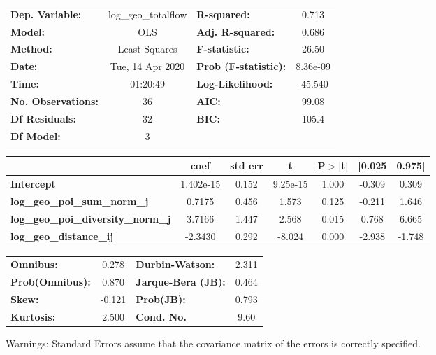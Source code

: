 \begin{center}
\begin{tabular}{lclc}
\toprule
\textbf{Dep. Variable:}                    & log\_geo\_totalflow & \textbf{  R-squared:         } &     0.713   \\
\textbf{Model:}                            &         OLS         & \textbf{  Adj. R-squared:    } &     0.686   \\
\textbf{Method:}                           &    Least Squares    & \textbf{  F-statistic:       } &     26.50   \\
\textbf{Date:}                             &   Tue, 14 Apr 2020  & \textbf{  Prob (F-statistic):} &  8.36e-09   \\
\textbf{Time:}                             &       01:20:49      & \textbf{  Log-Likelihood:    } &   -45.540   \\
\textbf{No. Observations:}                 &            36       & \textbf{  AIC:               } &     99.08   \\
\textbf{Df Residuals:}                     &            32       & \textbf{  BIC:               } &     105.4   \\
\textbf{Df Model:}                         &             3       & \textbf{                     } &             \\
\bottomrule
\end{tabular}
\begin{tabular}{lcccccc}
                                           & \textbf{coef} & \textbf{std err} & \textbf{t} & \textbf{P$> |$t$|$} & \textbf{[0.025} & \textbf{0.975]}  \\
\midrule
\textbf{Intercept}                         &    1.402e-15  &        0.152     &  9.25e-15  &         1.000        &       -0.309    &        0.309     \\
\textbf{log\_geo\_poi\_sum\_norm\_j}       &       0.7175  &        0.456     &     1.573  &         0.125        &       -0.211    &        1.646     \\
\textbf{log\_geo\_poi\_diversity\_norm\_j} &       3.7166  &        1.447     &     2.568  &         0.015        &        0.768    &        6.665     \\
\textbf{log\_geo\_distance\_ij}            &      -2.3430  &        0.292     &    -8.024  &         0.000        &       -2.938    &       -1.748     \\
\bottomrule
\end{tabular}
\begin{tabular}{lclc}
\textbf{Omnibus:}       &  0.278 & \textbf{  Durbin-Watson:     } &    2.311  \\
\textbf{Prob(Omnibus):} &  0.870 & \textbf{  Jarque-Bera (JB):  } &    0.464  \\
\textbf{Skew:}          & -0.121 & \textbf{  Prob(JB):          } &    0.793  \\
\textbf{Kurtosis:}      &  2.500 & \textbf{  Cond. No.          } &     9.60  \\
\bottomrule
\end{tabular}
\end{center}

Warnings: \newline
 [1] Standard Errors assume that the covariance matrix of the errors is correctly specified.